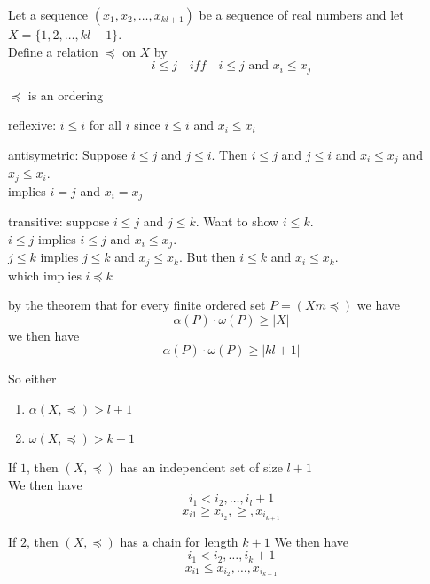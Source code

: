 \documentclass{report}
\begin{document}
\begin{proofWithHibiscus}
  Let a sequence $(x_1, x_2, \ldots, x_{kl+1})$ be a sequence of real numbers and let $X = \{1,2, \ldots , kl + 1 \}$. \\
  Define a relation $\preceq$ on $X$ by 
  \[ i \leq j \quad iff \quad i \leq j \text{ and } x_{i} \leq x_{j} \]
  \begin{ClaimWithMagnolia}
    $\preceq$ is an ordering
    \medskip

    reflexive: $i \leq i$ for all $i$ since $i \leq i$ and $x_{i} \leq x_{i}$ 

    \medskip

    antisymetric: Suppose $i \leq j$ and $j \leq i$. Then $i \leq j$ and $j \leq i$ and $x_i \leq x_j$ and $x_j \leq x_i$. \\
    implies $i = j$ and $x_i = x_j$ 

    \medskip

    transitive: suppose $i \leq j$ and $j \leq k$. Want to show $i \leq k$. \\
    $i \leq j$ implies $i \leq j$ and $x_i \leq x_j$. \\
    $j \leq k $ implies $j \leq k$ and $x_j \leq x_k$. But then $i \leq k$ and $x_i \leq x_k$.\\ 
    which implies $ i \preceq k$ 
  \end{ClaimWithMagnolia} 

  by the theorem that for every finite ordered set $ P = (Xm \preceq)$ we have 
  \[ \alpha (P) \cdot \omega (P) \geq |X| \] 
  we then have 
  \[ \alpha (P) \cdot \omega (P) \geq |kl + 1|\]
  
  \medskip 
  So either 
  \begin{enumerate}
    \item $\alpha (X, \preceq) > l + 1 $
    \item $\omega (X, \preceq) > k + 1 $
  \end{enumerate}

  If $1$, then $(X, \preceq )$ has an independent set of size $l +1$ \\ 
  We then have 
  \[i_1 < i_2, \ldots , i_l+1\]
  \[ x_{i{1}} \geq x_{i_{2}}, \geq , x_{i_{k+1}}\] 

  \smallskip


  If $2$, then $(X, \preceq )$ has a chain for length $k + 1$ 
  We then have 
  \[ i_1 < i_2, \ldots , i_k+1 \] 
  \[ x_{i{1}} \leq x_{i_{2}}, \ldots , x_{i_{k+1}}\] 



\end{proofWithHibiscus}
\end{document}
